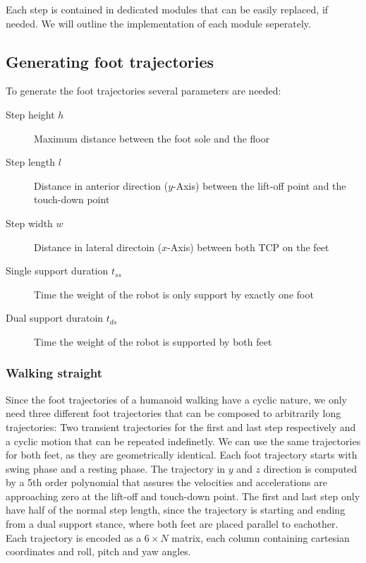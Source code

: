 \documentclass[english,ngerman]{KITreprt}
\newcommand{\clr}[2]{{\color{#1}{#2}}}
\newcommand{\todo}[1]{\marginpar{\clr{red}{#1}}}
\begin{document}
Each step is contained in dedicated modules that can be easily replaced,
if needed. We will outline the implementation of each module seperately.

\subsection{Generating foot
trajectories}\label{generating-foot-trajectories}

To generate the foot trajectories several parameters are needed:

\todo{table with used parameters}

\begin{description}
\item[Step height $h$]
Maximum distance between the foot sole and the floor
\item[Step length $l$]
Distance in anterior direction ($y$-Axis) between the lift-off point and
the touch-down point
\item[Step width $w$]
Distance in lateral directoin ($x$-Axis) between both TCP on the feet
\item[Single support duration $t_{ss}$]
Time the weight of the robot is only support by exactly one foot
\item[Dual support duratoin $t_{ds}$]
Time the weight of the robot is supported by both feet
\end{description}

\subsubsection{Walking straight}\label{walking-straight}

Since the foot trajectories of a humanoid walking have a cyclic nature,
we only need three different foot trajectories that can be composed to
arbitrarily long trajectories: Two transient trajectories for the first
and last step respectively and a cyclic motion that can be repeated
indefinetly. We can use the same trajectories for both feet, as they are
geometrically identical. Each foot trajectory starts with swing phase
and a resting phase. The trajectory in $y$ and $z$ direction is computed
by a 5th order polynomial that assures the velocities and accelerations
are approaching zero at the lift-off and touch-down point. The first and
last step only have half of the normal step length, since the trajectory
is starting and ending from a dual support stance, where both feet are
placed parallel to eachother. Each trajectory is encoded as a
$6 \times N$ matrix, each column containing cartesian coordinates and
roll, pitch and yaw angles.
\end{document}
